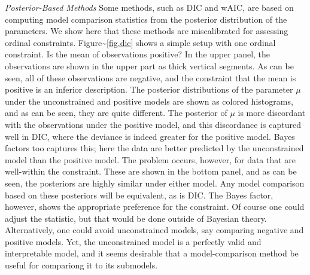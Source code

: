 \documentclass[english,man]{apa6}
\theoremstyle{definition}
\theoremstyle{definition}
\theoremstyle{remark}
\begin{document}
\emph{Posterior-Based Methods} Some methods, such as DIC and wAIC, are
based on computing model comparison statistics from the posterior
distribution of the parameters. We show here that these methods are
miscalibrated for assessing ordinal constraints.
Figure\textasciitilde{}\ref{fig.dic} shows a simple setup with one
ordinal constraint. Is the mean of observations positive? In the upper
panel, the observations are shown in the upper part as thick vertical
segments. As can be seen, all of these observations are negative, and
the constraint that the mean is positive is an inferior description. The
posterior distributions of the parameter \(\mu\) under the unconstrained
and positive models are shown as colored histograms, and as can be seen,
they are quite different. The posterior of \(\mu\) is more discordant
with the observations under the positive model, and this discordance is
captured well in DIC, where the deviance is indeed greater for the
positive model. Bayes factors too captures this; here the data are
better predicted by the unconstrained model than the positive model. The
problem occurs, however, for data that are well-within the constraint.
These are shown in the bottom panel, and as can be seen, the posteriors
are highly similar under either model. Any model comparison based on
these posteriors will be equivalent, as is DIC. The Bayes factor,
however, shows the appropriate preference for the constraint. Of course
one could adjust the statistic, but that would be done outside of
Bayesian theory. Alternatively, one could avoid unconstrained models,
say comparing negative and positive models. Yet, the unconstrained model
is a perfectly valid and interpretable model, and it seems desirable
that a model-comparison method be useful for compariong it to its
submodels.
\end{document}
